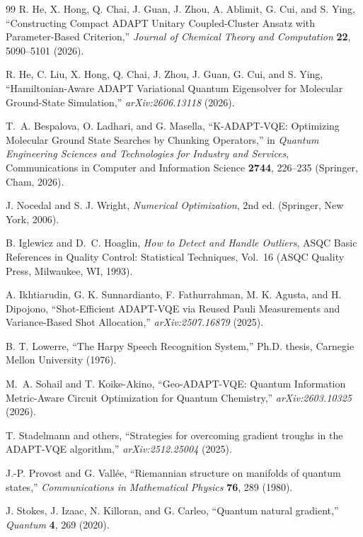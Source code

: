 \documentclass[
  reprint,
  amsmath,
  amssymb,
  aps,
  pra,
  nofootinbib,
  superscriptaddress,
  floatfix
]{revtex4-2}
\begin{document}
\begin{thebibliography}{99}
R. He, X. Hong, Q. Chai, J. Guan, J. Zhou, A. Ablimit, G. Cui, and S. Ying,
``Constructing Compact ADAPT Unitary Coupled-Cluster Ansatz with Parameter-Based Criterion,''
\emph{Journal of Chemical Theory and Computation} \textbf{22}, 5090--5101 (2026).

R. He, C. Liu, X. Hong, Q. Chai, J. Zhou, J. Guan, G. Cui, and S. Ying,
``Hamiltonian-Aware ADAPT Variational Quantum Eigensolver for Molecular Ground-State Simulation,''
\emph{arXiv:2606.13118} (2026).

T.~A. Bespalova, O. Ladhari, and G. Masella,
``K-ADAPT-VQE: Optimizing Molecular Ground State Searches by Chunking Operators,''
in \emph{Quantum Engineering Sciences and Technologies for Industry and Services}, Communications in Computer and Information Science \textbf{2744}, 226--235 (Springer, Cham, 2026).

J. Nocedal and S. J. Wright,
\emph{Numerical Optimization}, 2nd ed.
(Springer, New York, 2006).

B. Iglewicz and D.~C. Hoaglin,
\emph{How to Detect and Handle Outliers},
ASQC Basic References in Quality Control: Statistical Techniques, Vol.~16
(ASQC Quality Press, Milwaukee, WI, 1993).

A. Ikhtiarudin, G. K. Sunnardianto, F. Fathurrahman, M. K. Agusta, and H. Dipojono,
``Shot-Efficient ADAPT-VQE via Reused Pauli Measurements and Variance-Based Shot Allocation,''
\emph{arXiv:2507.16879} (2025).

B. T. Lowerre,
``The Harpy Speech Recognition System,''
Ph.D. thesis, Carnegie Mellon University (1976).

M.~A. Sohail and T. Koike-Akino,
``Geo-ADAPT-VQE: Quantum Information Metric-Aware Circuit Optimization for Quantum Chemistry,''
\emph{arXiv:2603.10325} (2026).

T. Stadelmann and others,
``Strategies for overcoming gradient troughs in the ADAPT-VQE algorithm,''
\emph{arXiv:2512.25004} (2025).

J.-P. Provost and G. Vall\'ee,
``Riemannian structure on manifolds of quantum states,''
\emph{Communications in Mathematical Physics} \textbf{76}, 289 (1980).

J. Stokes, J. Izaac, N. Killoran, and G. Carleo,
``Quantum natural gradient,''
\emph{Quantum} \textbf{4}, 269 (2020).


\end{thebibliography}
\end{document}
